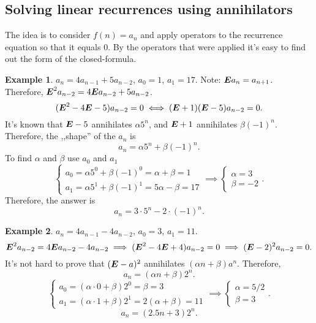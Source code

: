 \documentclass[a4paper]{article}
\theoremstyle{definition}
\newtheorem{example}{Example}[section]
\begin{document}
\subsection{Solving linear recurrences using annihilators}

The idea is to consider \(f(n) = a_n\) and
apply operators to the recurrence equation so that it equals 0.
By the operators that were applied it's easy to find out
the form of the closed-formula.

\begin{example}
  \(a_n = 4 a_{n - 1} + 5 a_{n - 2}\), \(a_0 = 1\), \(a_1 = 17\).
  Note: \(\boldsymbol{E} a_n = a_{n + 1}\).
  Therefore, \(\boldsymbol{E}^2 a_{n - 2} = 4 \boldsymbol{E} a_{n - 2} + 5 a_{n - 2}\).
  \[
    (\boldsymbol{E}^2 - 4 \boldsymbol{E} - 5) a_{n - 2} = 0
    \iff
    (\boldsymbol{E} + 1)(\boldsymbol{E} - 5) a_{n - 2} = 0
  .\]
  It's known that \(\boldsymbol{E} - 5\) annihilates \(\alpha 5^n\),
  and \(\boldsymbol{E} + 1\) annihilates \(\beta (-1)^n\).
  Therefore, the ,,shape'' of the \(a_n\) is
   \[
    a_n = \alpha 5^n + \beta (-1)^n
  .\]
  To find \(\alpha\) and \(\beta\) use \(a_0\) and \(a_1\)
  \[
  \begin{cases}
    a_0 = \alpha 5^0 + \beta (-1)^0 = \alpha + \beta = 1 \\
    a_1 = \alpha 5^1 + \beta (-1)^1 = 5 \alpha - \beta = 17
  \end{cases}
  \implies
  \begin{cases}
    \alpha = 3 \\
    \beta = -2
  \end{cases}
  .\]
  Therefore, the answer is
  \[
  a_n = 3 \cdot 5^n - 2 \cdot (-1)^n
  .\]
\end{example}
\begin{example}
  \(a_n = 4 a_{n - 1} - 4 a_{n - 2}\), \(a_0 = 3\), \(a_1 = 11\).
  \[
    \boldsymbol{E}^2 a_{n - 2} = 4 \boldsymbol{E} a_{n - 2} - 4 a_{n - 2}
    \implies
    (\boldsymbol{E}^2 - 4 \boldsymbol{E} + 4) a_{n - 2} = 0
    \implies
    (\boldsymbol{E} - 2)^2 a_{n - 2} = 0
  .\]
  It's not hard to prove that \((\boldsymbol{E} - a)^2\) annihilates
  \((\alpha n + \beta) a^n\).
  Therefore,
  \[
  a_n = (\alpha n + \beta) 2^n
  .\]
  \[
  \begin{cases}
    a_0 = (\alpha \cdot 0 + \beta) 2^0 = \beta = 3 \\
    a_1 = (\alpha \cdot 1 + \beta) 2^1 = 2 (\alpha + \beta) = 11
  \end{cases}
  \implies
  \begin{cases}
    \alpha = 5/2 \\
    \beta = 3
  \end{cases}
  .\]
  \[
    a_n = (2.5 n + 3) 2^n
  .\]
\end{example}
\end{document}
